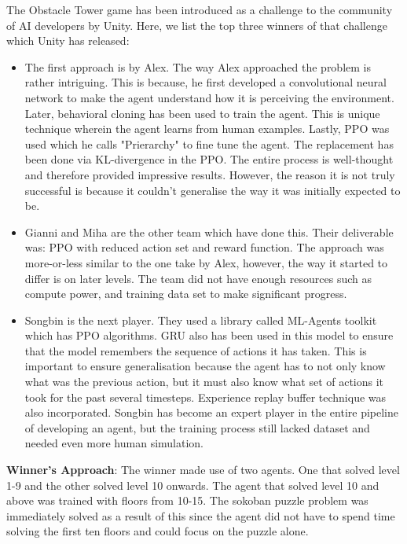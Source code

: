 \documentclass[conference]{IEEEtran}
\begin{document}
The Obstacle Tower game has been introduced as a challenge to the community of AI developers by Unity. Here, we list the top three winners of that challenge which Unity has released:
\begin{itemize}
\item The first approach is by Alex. The way Alex approached the problem is rather intriguing. This is because, he first developed a convolutional neural network to make the agent understand how it is perceiving the environment. Later, behavioral cloning has been used to train the agent. This is unique technique wherein the agent learns from human examples. Lastly, PPO was used which he calls "Prierarchy" to fine tune the agent. The replacement has been done via KL-divergence in the PPO. The entire process is well-thought and therefore provided impressive results. However, the reason it is not truly successful is because it couldn't generalise the way it was initially expected to be.
\item Gianni and Miha are the other team which have done this. Their deliverable was: PPO with reduced action set and reward function. The approach was more-or-less similar to the one take by Alex, however, the way it started to differ is on later levels. The team did not have enough resources such as compute power, and training data set to make significant progress.
\item Songbin is the next player. They used a library called ML-Agents toolkit which has PPO algorithms. GRU also has been used in this model to ensure that the model remembers the sequence of actions it has taken. This is important to ensure generalisation because the agent has to not only know what was the previous action, but it must also know what set of actions it took for the past several timesteps. Experience replay buffer technique was also incorporated. Songbin has become an expert player in the entire pipeline of developing an agent, but the training process still lacked dataset and needed even more human simulation.
\end{itemize}

\textbf{Winner’s Approach}: The winner made use of two agents. One that solved level 1-9 and the other solved level 10 onwards. The agent that solved level 10 and above was trained with floors from 10-15. The sokoban puzzle problem was immediately solved as a result of this since the agent did not have to spend time solving the first ten floors and could focus on the puzzle alone.
\end{document}
